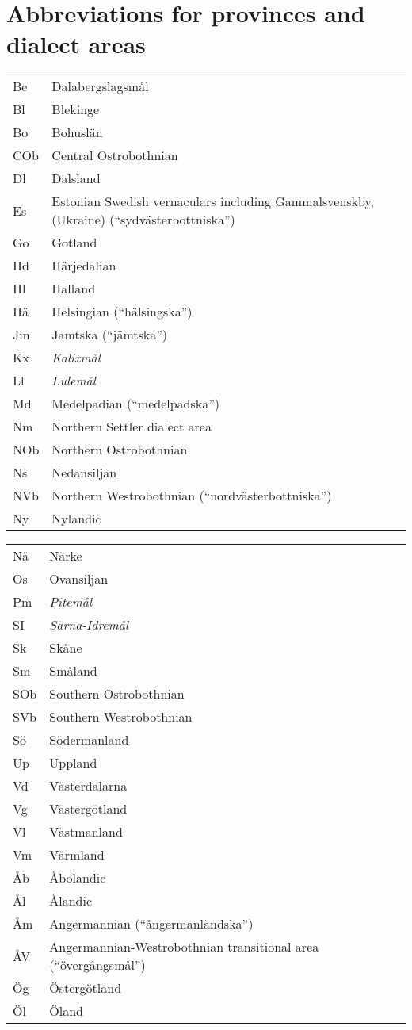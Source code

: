 \chapter{Abbreviations for provinces and dialect areas}
\begin{tabular}{lp{5cm}}
Be & Dalabergslagsmål  \\
Bl & Blekinge  \\
Bo & Bohuslän  \\
COb & Central Ostrobothnian  \\
Dl & Dalsland  \\
Es & Estonian Swedish vernaculars 
including Gammalsvenskby, 
(Ukraine) 
(“sydvästerbottniska”) 	\\
Go & Gotland  \\
Hd & Härjedalian  \\
Hl & Halland  \\
Hä & Helsingian (“hälsingska”)  \\
Jm & Jamtska (“jämtska”)  \\
Kx & \textit{Kalixmål}  \\
Ll & \textit{Lulemål}  \\
Md & Medelpadian (“medelpadska”)  \\
Nm & Northern Settler dialect area  \\
NOb & Northern Ostrobothnian \\
Ns & Nedansiljan  \\
NVb & Northern Westrobothnian
 (“nordvästerbottniska”)  \\
Ny & Nylandic  \\
\end{tabular}
\begin{tabular}{lp{5cm}}	
Nä & Närke  \\
 Os & Ovansiljan \\
 Pm & \textit{Pitemål} \\
 SI & \textit{Särna-Idremål} \\
Sk & Skåne \\
 Sm & Småland \\
 SOb & Southern Ostrobothnian\\ 
  SVb  & Southern Westrobothnian\\
 Sö & Södermanland \\
 Up & Uppland \\
Vd & Västerdalarna \\
 Vg & Västergötland \\
 Vl & Västmanland \\
 Vm & Värmland \\
 Åb & Åbolandic \\
 Ål & Ålandic \\
 Åm & Angermannian (“ångermanländska”) \\
 ÅV & Angermannian-Westrobothnian  transitional area  (“övergångsmål”)\\ 
 Ög & Östergötland \\
 Öl & Öland \\		
\end{tabular}
